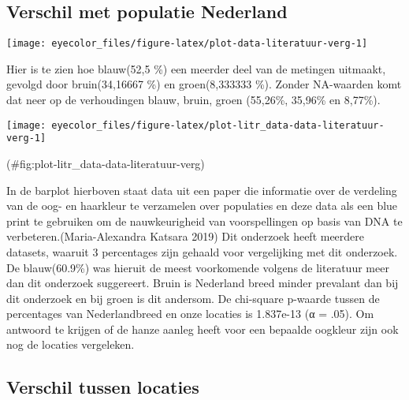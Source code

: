 \documentclass[
]{article}
\let\origfigure\figure
\let\endorigfigure\endfigure
\renewenvironment{figure}[1][2] {
    \expandafter\origfigure\expandafter[H]
} {
    \endorigfigure
}
\begin{document}
\hypertarget{verschil-met-populatie-nederland}{%
\subsection{Verschil met populatie Nederland}\label{verschil-met-populatie-nederland}}

\begin{figure}
\texttt{[image: eyecolor\_files/figure-latex/plot-data-literatuur-verg-1]} \caption{Oogkleuren tegenover frequenties. Het totaal aantal waarnemingen van het rechteroogkleur. De door meerderheid waargenomen kleur onder analisten. NA als er geen meerderheid was.}\label{fig:plot-data-literatuur-verg}
\end{figure}

Hier is te zien hoe blauw(52,5 \%) een meerder deel van de metingen
uitmaakt, gevolgd door bruin(34,16667 \%) en groen(8,333333 \%). Zonder
NA-waarden komt dat neer op de verhoudingen blauw, bruin, groen (55,26\%,
35,96\% en 8,77\%).

\begin{figure}
\texttt{[image: eyecolor\_files/figure-latex/plot-litr\_data-data-literatuur-verg-1]} \caption{Oogkleur tegen percentages voor data uit literatuur en dit onderzoek. Meerderheid waargenomen door analisten van het rechter oogkleur. Oogkleur percentages uit fsigenetics - "True colors: A literature review on the spatial distribution of eye and hair pigmentation" via researchgate}(\#fig:plot-litr_data-data-literatuur-verg)
\end{figure}

In de barplot hierboven staat data uit een paper die informatie over de
verdeling van de oog- en haarkleur te verzamelen over populaties en deze
data als een blue print te gebruiken om de nauwkeurigheid van
voorspellingen op basis van DNA te verbeteren.(Maria-Alexandra Katsara 2019) Dit
onderzoek heeft meerdere datasets, waaruit 3 percentages zijn gehaald
voor vergelijking met dit onderzoek. De blauw(60.9\%) was hieruit de
meest voorkomende volgens de literatuur meer dan dit onderzoek
suggereert. Bruin is Nederland breed minder prevalant dan bij dit
onderzoek en bij groen is dit andersom. De chi-square p-waarde tussen de
percentages van Nederlandbreed en onze locaties is 1.837e-13 (α = .05).
Om antwoord te krijgen of de hanze aanleg heeft voor een bepaalde
oogkleur zijn ook nog de locaties vergeleken.

\hypertarget{verschil-tussen-locaties}{%
\subsection{Verschil tussen locaties}\label{verschil-tussen-locaties}}
\end{document}

